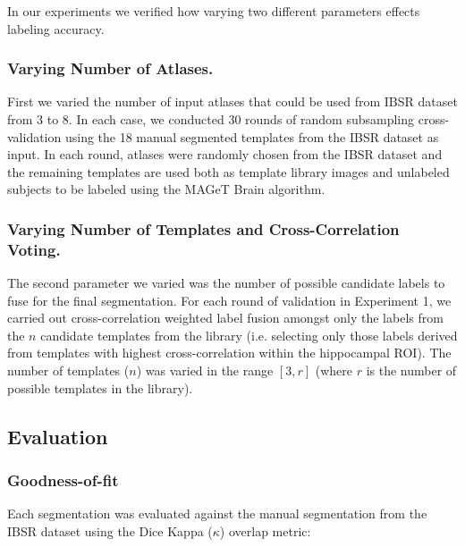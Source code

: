 \documentclass{article}
\begin{document}
In our experiments we verified how varying two different parameters effects
labeling accuracy. 

\subsubsection{Varying Number of Atlases.}
First we varied the number of input atlases that could be used from IBSR
dataset from 3 to 8.  In each case, we conducted 30 rounds of random
subsampling cross-validation using the 18 manual segmented templates from
the IBSR dataset as input. In each round, atlases were randomly chosen from
the IBSR dataset and the remaining templates are used both as template
library images and unlabeled subjects to be labeled using the MAGeT Brain
algorithm.  

\subsubsection{Varying Number of Templates and Cross-Correlation Voting.}
The second parameter we varied was the number of possible candidate
labels to fuse for the final segmentation.  For each round of
validation in Experiment 1, we carried out cross-correlation weighted
label fusion amongst only the labels from the $n$ candidate templates
from the library (i.e. selecting only those labels derived from
templates with highest cross-correlation within the hippocampal ROI).
The number of templates ($n$) was varied in the range $[3, r]$ (where $r$
is the number of possible templates in the library).



\subsection{Evaluation}
\subsubsection{Goodness-of-fit}
Each segmentation was evaluated against the manual segmentation from the IBSR
dataset using the Dice Kappa ($\kappa$) overlap metric:
\end{document}
